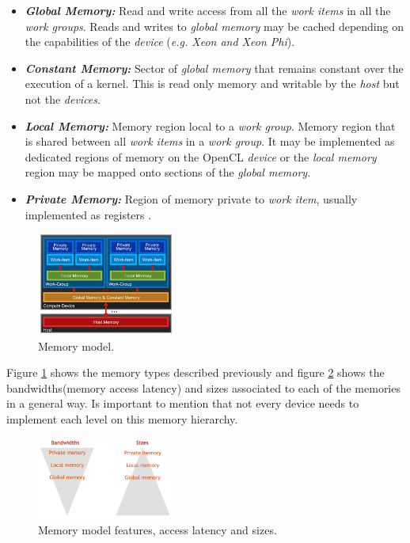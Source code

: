 \begin{itemize}
    \item\textbf{\textit{Global Memory:}} Read and write access from all the \emph{work items} in all the \emph{work groups}. Reads
        and writes to \emph{global memory} may be cached depending on the capabilities of the \emph{device}\cite{opencl12}
        (\emph{e.g. Xeon and Xeon Phi}).

    \item\textbf{\textit{Constant Memory:}} Sector of \emph{global memory} that remains constant over the execution of a kernel.
        This is read only memory and writable by the \emph{host} but not the \emph{devices}\cite{wikipedia_opencl,opencl12}.

    \item\textbf{\textit{Local Memory:}} Memory region local to a \emph{work group}. Memory region that is shared between all
        \emph{work items} in a \emph{work group}. It may be implemented as dedicated regions of memory on the OpenCL \emph{device}
        or the \emph{local memory} region may be mapped onto sections of the \emph{global memory}\cite{opencl12}.

    \item\textbf{\textit{Private Memory:}} Region of memory private to \emph{work item}, usually implemented as registers
        \cite{wikipedia_opencl,opencl12}.
\end{itemize}

\begin{figure}[!h]
    \centering
    \includegraphics[width=0.4\textwidth]{figures/memories1.png}
    \caption{Memory model\cite{hands_on_opencl}.}
    \label{MemoryModel}
\end{figure}

\par{Figure \ref{MemoryModel} shows the memory types described previously and figure \ref{MemoryModelFeatures} shows the 
    bandwidths(memory access latency) and sizes associated to each of the memories in a general way. Is important to mention that
    not every device needs to implement each level on this memory hierarchy\cite{wikipedia_opencl}.}

\begin{figure}[!h]
    \centering
    \includegraphics[width=0.4\textwidth]{figures/memories.png}
    \caption{Memory model features, access latency and sizes\cite{hands_on_opencl}.}
    \label{MemoryModelFeatures}
\end{figure}


